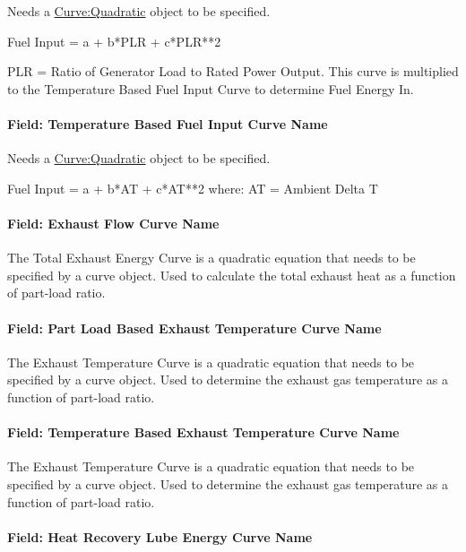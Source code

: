 Needs a \hyperref[curvequadratic]{Curve:Quadratic} object to be specified.

Fuel Input = a + b*PLR + c*PLR**2

PLR = Ratio of Generator Load to Rated Power Output. This curve is multiplied to the Temperature Based Fuel Input Curve to determine Fuel Energy In.

\paragraph{Field: Temperature Based Fuel Input Curve Name}\label{field-temperature-based-fuel-input-curve-name}

Needs a \hyperref[curvequadratic]{Curve:Quadratic} object to be specified.

Fuel Input = a + b*AT + c*AT**2 where: AT = Ambient Delta T

\paragraph{Field: Exhaust Flow Curve Name}\label{field-exhaust-flow-curve-name}

The Total Exhaust Energy Curve is a quadratic equation that needs to be specified by a curve object. Used to calculate the total exhaust heat as a function of part-load ratio.

\paragraph{Field: Part Load Based Exhaust Temperature Curve Name}\label{field-part-load-based-exhaust-temperature-curve-name}

The Exhaust Temperature Curve is a quadratic equation that needs to be specified by a curve object. Used to determine the exhaust gas temperature as a function of part-load ratio.

\paragraph{Field: Temperature Based Exhaust Temperature Curve Name}\label{field-temperature-based-exhaust-temperature-curve-name}

The Exhaust Temperature Curve is a quadratic equation that needs to be specified by a curve object. Used to determine the exhaust gas temperature as a function of part-load ratio.

\paragraph{Field: Heat Recovery Lube Energy Curve Name}\label{field-heat-recovery-lube-energy-curve-name}

